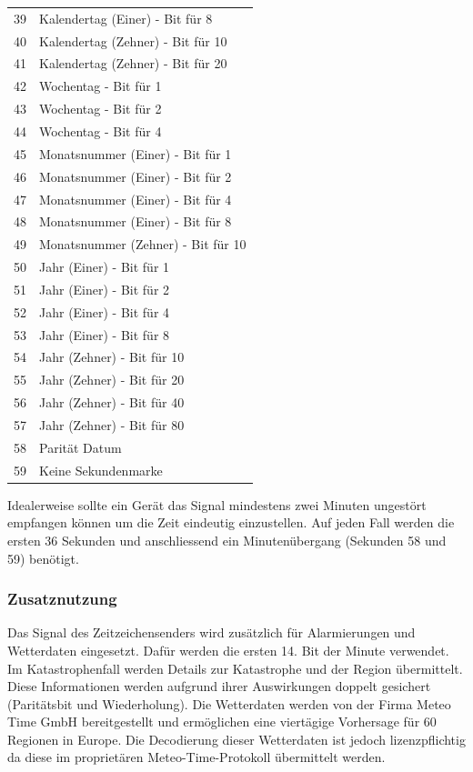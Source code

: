 \begin{longtable}{p{0.5cm} p{13.5cm}}
39 & Kalendertag (Einer) - Bit für 8 \\
40 & Kalendertag (Zehner) - Bit für 10 \\
41 & Kalendertag (Zehner) - Bit für 20 \\
42 & Wochentag - Bit für 1 \\
43 & Wochentag - Bit für 2 \\
44 & Wochentag - Bit für 4 \\
45 & Monatsnummer (Einer) - Bit für 1 \\
46 & Monatsnummer (Einer) - Bit für 2 \\
47 & Monatsnummer (Einer) - Bit für 4 \\
48 & Monatsnummer (Einer) - Bit für 8 \\
49 & Monatsnummer (Zehner) - Bit für 10 \\
50 & Jahr (Einer) - Bit für 1 \\
51 & Jahr (Einer) - Bit für 2 \\
52 & Jahr (Einer) - Bit für 4 \\
53 & Jahr (Einer) - Bit für 8 \\
54 & Jahr (Zehner) - Bit für 10 \\
55 & Jahr (Zehner) - Bit für 20 \\
56 & Jahr (Zehner) - Bit für 40 \\
57 & Jahr (Zehner) - Bit für 80 \\
58 & Parität Datum \\
59 & Keine Sekundenmarke
\end{longtable}

Idealerweise sollte ein Gerät das Signal mindestens zwei Minuten ungestört empfangen können um die Zeit eindeutig einzustellen. Auf jeden Fall werden die ersten 36 Sekunden und anschliessend ein Minutenübergang (Sekunden 58 und 59) benötigt.


\subsubsection{Zusatznutzung}
Das Signal des Zeitzeichensenders wird zusätzlich für Alarmierungen und Wetterdaten eingesetzt. Dafür werden die ersten 14. Bit der Minute verwendet. Im Katastrophenfall werden Details zur Katastrophe und der Region übermittelt. Diese Informationen werden aufgrund ihrer Auswirkungen doppelt gesichert (Paritätsbit und Wiederholung). Die Wetterdaten werden von der Firma Meteo Time GmbH bereitgestellt und ermöglichen eine viertägige Vorhersage für 60 Regionen in Europe. Die Decodierung dieser Wetterdaten ist jedoch lizenzpflichtig da diese im proprietären Meteo-Time-Protokoll übermittelt werden.

